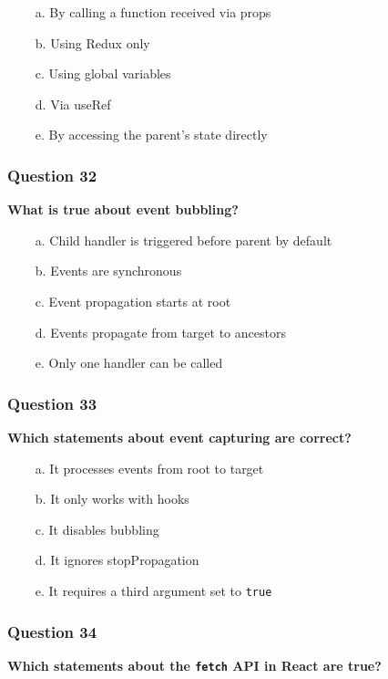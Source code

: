 \documentclass{article}
\newcommand{\cmark}{\textcolor{green}{\ding{51}}} %
\newcommand{\xmark}{\textcolor{red}{\ding{55}}}   %
\begin{document}
\begin{itemize}
  \item[\cmark\ a.] By calling a function received via props
  \item[\xmark\ b.] Using Redux only
  \item[\xmark\ c.] Using global variables
  \item[\xmark\ d.] Via useRef
  \item[\xmark\ e.] By accessing the parent's state directly
\end{itemize}


\subsubsection*{Question 32}
\textbf{What is true about event bubbling?}

\begin{itemize}
  \item[\cmark\ a.] Child handler is triggered before parent by default
  \item[\xmark\ b.] Events are synchronous
  \item[\xmark\ c.] Event propagation starts at root
  \item[\cmark\ d.] Events propagate from target to ancestors
  \item[\xmark\ e.] Only one handler can be called
\end{itemize}

\subsubsection*{Question 33}
\textbf{Which statements about event capturing are correct?}

\begin{itemize}
  \item[\cmark\ a.] It processes events from root to target
  \item[\xmark\ b.] It only works with hooks
  \item[\xmark\ c.] It disables bubbling
  \item[\xmark\ d.] It ignores stopPropagation
  \item[\cmark\ e.] It requires a third argument set to \texttt{true}
\end{itemize}

\subsubsection*{Question 34}
\textbf{Which statements about the \texttt{fetch} API in React are true?}
\end{document}
